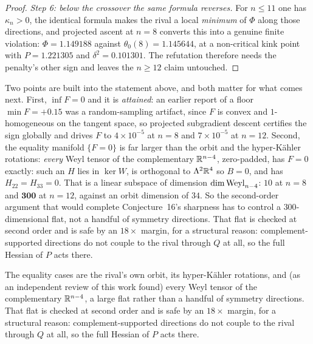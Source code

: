 \begin{proof}
\emph{Step 6: below the crossover the same formula reverses.} For $n\le11$ one has $\kappa_n>0$, the identical formula makes the rival a local \emph{minimum} of $\Phi$ along those directions, and projected ascent at $n=8$ converts this into a genuine finite violation: $\Phi=1.149188$ against $\theta_0(8)=1.145644$, at a non-critical kink point with $P=1.221305$ and $\delta^2=0.101301$. The refutation therefore needs the penalty's other sign and leaves the $n\ge12$ claim untouched.
\end{proof}

\begin{remarkstar}
Two points are built into the statement above, and both matter for what comes next. First, $\inf F=0$ and it is \emph{attained}: an earlier report of a floor $\min F=+0.15$ was a random-sampling artifact, since $F$ is convex and $1$-homogeneous on the tangent space, so projected subgradient descent certifies the sign globally and drives $F$ to $4\times10^{-5}$ at $n=8$ and $7\times10^{-5}$ at $n=12$. Second, the equality manifold $\{F=0\}$ is far larger than the orbit and the hyper-K\"ahler rotations: \emph{every} Weyl tensor of the complementary $\mathbb{R}^{n-4}$, zero-padded, has $F=0$ exactly: such an $H$ lies in $\ker W$, is orthogonal to $\Lambda^2\mathbb{R}^4$ so $B=0$, and has $H_{22}=H_{33}=0$. That is a linear subspace of dimension $\dim\mathrm{Weyl}_{n-4}$: $10$ at $n=8$ and $\mathbf{300}$ at $n=12$, against an orbit dimension of $34$. So the second-order argument that would complete Conjecture~16's sharpness has to control a $300$-dimensional flat, not a handful of symmetry directions. That flat is checked at second order and is safe by an $18\times$ margin, for a structural reason: complement-supported directions do not couple to the rival through $Q$ at all, so the full Hessian of $P$ acts there.
\end{remarkstar}

The equality cases are the rival's own orbit, its hyper-K\"ahler rotations, and (as an independent review of this work found) every Weyl tensor of the complementary $\mathbb{R}^{n-4}$, a large flat rather than a handful of symmetry directions. That flat is checked at second order and is safe by an $18\times$ margin, for a structural reason: complement-supported directions do not couple to the rival through $Q$ at all, so the full Hessian of $P$ acts there.

